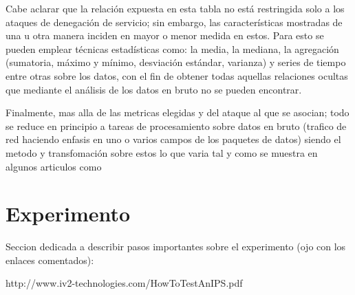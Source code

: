 \documentclass[12pt]{article}
\begin{document}
Cabe aclarar que la relación expuesta en esta tabla no está restringida solo a los ataques de denegación de servicio; sin embargo, las características mostradas de una u otra manera inciden en mayor o menor medida en estos. Para esto se pueden emplear técnicas estadísticas \citep{sans_ids_metrics} como: la media, la mediana, la agregación (sumatoria, máximo y mínimo, desviación estándar, varianza) y series de tiempo entre otras sobre los datos, con el fin de obtener todas aquellas relaciones ocultas que mediante el análisis de los datos en bruto no se pueden encontrar.  

Finalmente, mas alla de las metricas elegidas y del ataque al que se asocian; todo se reduce en principio a tareas de procesamiento sobre datos en bruto (trafico de red haciendo enfasis en uno o varios campos de los paquetes de datos) siendo el metodo y transfomación sobre estos lo que varia tal y como se muestra en algunos articulos como \citep{review_ddos_approaches,det_tech_ddos} 







\section{Experimento}

Seccion dedicada a describir pasos importantes sobre el experimento (ojo con los enlaces comentados):





http://www.iv2-technologies.com/HowToTestAnIPS.pdf
\end{document}
